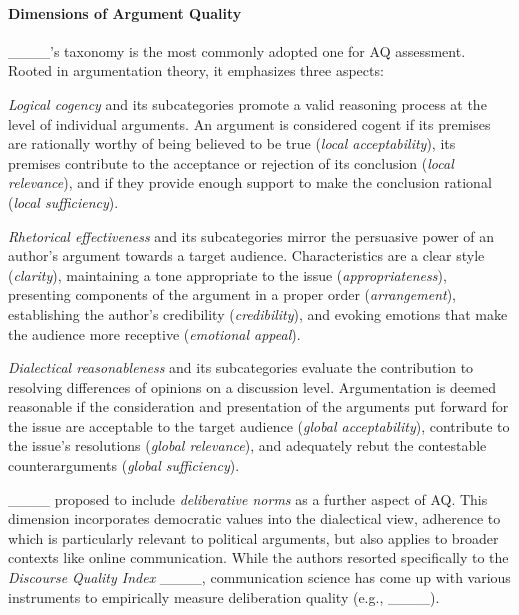 \paragraph{Dimensions of Argument Quality}
\label{subsec:AQ}

____'s taxonomy is the most commonly adopted one for AQ assessment. Rooted in argumentation theory, it emphasizes three aspects:

\textit{Logical cogency} and its subcategories promote a valid reasoning process at the level of individual arguments. An argument is considered cogent if its premises are rationally worthy of being believed to be true (\textit{local acceptability}), its premises contribute to the acceptance or rejection of its conclusion (\textit{local relevance}), and if they provide enough support to make the conclusion rational (\textit{local sufficiency}).

\textit{Rhetorical effectiveness} and its subcategories mirror the persuasive power of an author's argument towards a target audience. Characteristics are a clear style (\textit{clarity}), maintaining a tone appropriate to the issue (\textit{appropriateness}), presenting components of the argument in a proper order (\textit{arrangement}), establishing the author's credibility (\textit{credibility}), and evoking emotions that make the audience more receptive (\textit{emotional appeal}).

\textit{Dialectical reasonableness} and its subcategories evaluate the contribution to resolving differences of opinions on a discussion level. Argumentation is deemed reasonable if the consideration and presentation of the arguments put forward for the issue are acceptable to the target audience (\textit{global acceptability}), contribute to the issue's resolutions (\textit{global relevance}), and adequately rebut the contestable counterarguments (\textit{global sufficiency}).

____ proposed to include \textit{deliberative norms} as a further aspect of AQ. This dimension incorporates democratic values into the dialectical view, adherence to which is particularly relevant to political arguments, but also applies to broader contexts like online communication. While the authors resorted specifically to the \emph{Discourse Quality Index} ____, communication science has come up with various instruments to empirically measure deliberation quality (e.g., ____). 

